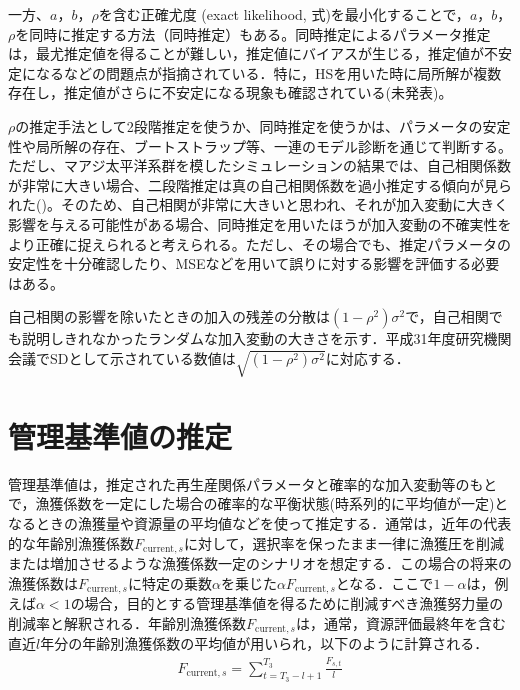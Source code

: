 \documentclass[11pt]{jsarticle}
\begin{document}
一方、$a$，$b$，$\rho$を含む正確尤度 (exact likelihood, 式\cite{subsec:rho})を最小化することで，$a$，$b$，$\rho$を同時に推定する方法（同時推定）もある。同時推定によるパラメータ推定は，最尤推定値を得ることが難しい，推定値にバイアスが生じる，推定値が不安定になるなどの問題点が指摘されている\cite{johnson}．特に，HSを用いた時に局所解が複数存在し，推定値がさらに不安定になる現象も確認されている(未発表)。

$\rho$の推定手法として2段階推定を使うか、同時推定を使うかは、パラメータの安定性や局所解の存在、ブートストラップ等、一連のモデル診断を通じて判断する。ただし、マアジ太平洋系群を模したシミュレーションの結果では、自己相関係数が非常に大きい場合、二段階推定は真の自己相関係数を過小推定する傾向が見られた(\cite{rho_simulation})。そのため、自己相関が非常に大きいと思われ、それが加入変動に大きく影響を与える可能性がある場合、同時推定を用いたほうが加入変動の不確実性をより正確に捉えられると考えられる。ただし、その場合でも、推定パラメータの安定性を十分確認したり、MSEなどを用いて誤りに対する影響を評価する必要はある。

自己相関の影響を除いたときの加入の残差の分散は$(1-\rho^2) \sigma^2$で，自己相関でも説明しきれなかったランダムな加入変動の大きさを示す．平成31年度研究機関会議でSDとして示されている数値は$\sqrt{(1-\rho^2) \sigma^2}$に対応する．

\section{管理基準値の推定}
管理基準値は，推定された再生産関係パラメータと確率的な加入変動等のもとで，漁獲係数を一定にした場合の確率的な平衡状態(時系列的に平均値が一定)となるときの漁獲量や資源量の平均値などを使って推定する．通常は，近年の代表的な年齢別漁獲係数$F_{\mathrm{current},s}$に対して，選択率を保ったまま一律に漁獲圧を削減または増加させるような漁獲係数一定のシナリオを想定する．この場合の将来の漁獲係数は$F_{\mathrm{current},s}$に特定の乗数$\alpha$を乗じた$\alpha F_{\mathrm{current},s}$となる．ここで$1-\alpha$は，例えば$\alpha<1$の場合，目的とする管理基準値を得るために削減すべき漁獲努力量の削減率と解釈される．年齢別漁獲係数$F_{\mathrm{current},s}$は，通常，資源評価最終年を含む直近$l$年分の年齢別漁獲係数の平均値が用いられ，以下のように計算される．
\begin{eqnarray}
  F_{\mathrm{current},s} = \sum_{t=T_3-l+1}^{T_3}\frac{F_{s,t}}{l}
\end{eqnarray}
\end{document}
